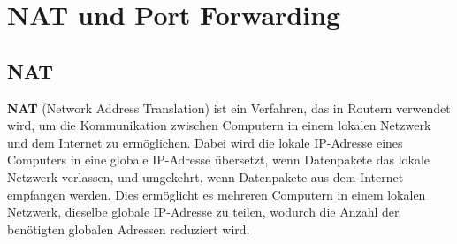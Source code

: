 
\chapter{\texorpdfstring{\gls{NAT} und Port Forwarding}{NAT und Port Forwarding}}
\label{app:nat_port_forwarding}
\section{\texorpdfstring{\acrfull{NAT}}{Network Address Translation (NAT)}}
\textbf{\gls{NAT}} (Network Address Translation) ist ein Verfahren, das in Routern verwendet wird, um die Kommunikation zwischen Computern in einem lokalen Netzwerk und dem Internet zu ermöglichen. Dabei wird die lokale \gls{IP}-Adresse eines Computers in eine globale \gls{IP}-Adresse übersetzt, wenn Datenpakete das lokale Netzwerk verlassen, und umgekehrt, wenn Datenpakete aus dem Internet empfangen werden. Dies ermöglicht es mehreren Computern in einem lokalen Netzwerk, dieselbe globale \gls{IP}-Adresse zu teilen, wodurch die Anzahl der benötigten globalen Adressen reduziert wird.

